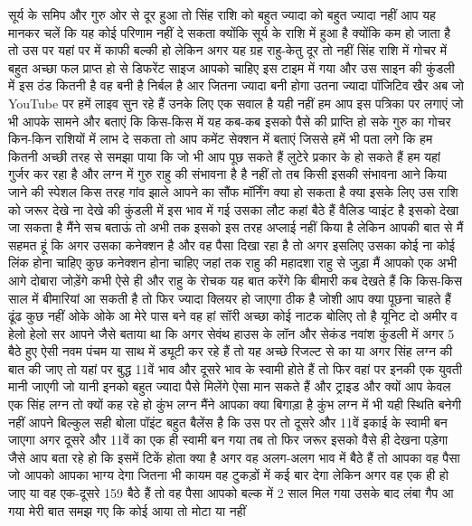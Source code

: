 सूर्य के समिप और गुरु ओर से दूर हुआ तो सिंह राशि को बहुत ज्यादा को बहुत ज्यादा
नहीं आप यह मानकर चलें कि यह कोई परिणाम नहीं दे सकता क्योंकि सूर्य के राशि में
हुआ है क्योंकि कम हो जाता है तो उस पर यहां पर में काफी बल्की हो लेकिन अगर यह
ग्रह राहु-केतु दूर तो नहीं सिंह राशि में गोचर में बहुत अच्छा फल प्राप्त हो से
डिफरेंट साइज आपको चाहिए इस टाइम में गया और उस साइन की कुंडली में
इस ठंड कितनी है वह बनी है निर्बल है आर जितना ज्यादा बनी होगा उतना ज्यादा पॉजिटिव खैर अब जो YouTube पर हमें लाइव
सुन रहे हैं उनके लिए एक सवाल है यही नहीं हम आप इस पत्रिका पर लगाएं जो भी आपके
सामने और बताएं कि किस-किस में यह कब-कब इसको पैसे की प्राप्ति हो सके गुरु का
गोचर किन-किन राशियों में लाभ दे सकता तो आप कमेंट सेक्शन में बताएं जिससे हमें भी पता लगे कि हम कितनी अच्छी तरह से समझा
पाया कि जो भी आप पूछ सकते हैं
लुटेरे प्रकार के हो सकते हैं हम यहां
गुर्जर कर रहा है और लग्न में गुरु राहु
की संभावना है है नहीं तो तब किसी इसकी संभावना आने किया
जाने की स्पेशल किस तरह गांव झाले आपने का सौंफ मॉर्निंग क्या हो सकता है क्या इसके
लिए उस राशि को जरूर देखे ना देखे की कुंडली में इस भाव में गई उसका लौट कहां बैठे हैं वैलिड प्वाइंट है इसको देखा जा
सकता है मैंने सच बताऊं तो अभी तक इसको इस तरह अप्लाई नहीं किया है लेकिन आपकी बात से मैं सहमत हूं कि अगर उसका कनेक्शन है
और वह पैसा दिखा रहा है तो अगर इसलिए उसका कोई ना कोई लिंक होना चाहिए कुछ कनेक्शन होना चाहिए जहां तक राहु की महादशा राहु
से जुड़ा मैं आपको एक अभी आगे दोबारा जोड़ेंगे कभी ऐसे ही और राहु के रोचक यह बात करेंगे कि बीमारी कब देखते हैं कि किस-किस साल में बीमारियां आ सकती है तो
फिर ज्यादा क्लियर हो जाएगा ठीक है जोशी आप क्या पूछना चाहते हैं ढूंढ कुछ नहीं ओके ओके आ मेरे पास बने वह हां सॉरी अच्छा
कोई नाटक बोलिए तो है यूनिट दो अमीर व हेलो हेलो सर आपने जैसे बताया था कि अगर
सेवंथ हाउस के लॉन और सेकंड नवांश कुंडली में अगर 5 बैठे हुए ऐसी नवम पंचम या साथ में ड्यूटी कर रहे हैं तो यह अच्छे रिजल्ट
से का या अगर सिंह लग्न की बात की जाए तो यहां पर बुद्ध 11वें भाव और दूसरे भाव के स्वामी होते हैं तो फिर वहां पर इनकी एक
युवती मानी जाएगी जो यानी इनको बहुत ज्यादा पैसे मिलेंगे ऐसा मान सकते हैं और ट्राइड और क्यों आप केवल एक सिंह लग्न तो
क्यों कह रहे हो कुंभ लग्न मैंने आपका क्या बिगाड़ा है कुंभ लग्न में भी यही स्थिति बनेगी नहीं आपने बिल्कुल सही बोला पॉइंट बहुत बैलेंस है कि उस पर तो दूसरे
और 11वें इकाई के स्वामी बन जाएगा अगर दूसरे और 11वें का एक ही स्वामी बन गया तब तो फिर जरूर इसको वैसे ही देखना पड़ेगा
जैसे आप बता रहे हो कि इसमें टिकें होता क्या है अगर वह अलग-अलग भाव में बैठे हैं तो आपका वह पैसा जो आपको आपका भाग्य देगा
जितना भी कायम वह टुकड़ों में कई बार देगा लेकिन अगर वह एक ही हो जाए या वह एक-दूसरे
159 बैठे हैं तो वह पैसा आपको बल्क में 2 साल मिल गया उसके बाद लंबा गैप आ गया मेरी बात समझ गए कि कोई आया तो मोटा या नहीं
